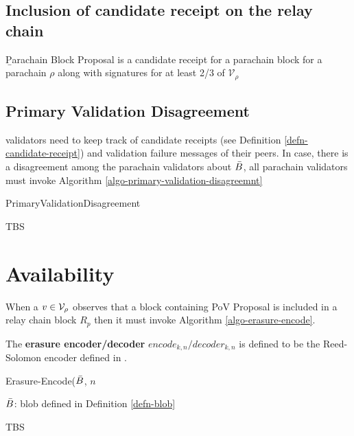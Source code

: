 \subsection{Inclusion of candidate receipt on the relay chain}

\begin{definition}
  \label{defn-para-proposal}
        {\b Parachain Block Proposal} is a candidate receipt for a parachain block for a parachain $\rho$ along with signatures for at least 2/3 of $\mathcal{V}_\rho$ 

\end{definition}

\subsection{Primary Validation Disagreement}
\label{sect-primary-validation-disagreemnt}
 validators need to keep track of candidate receipts (see Definition \ref{defn-candidate-receipt}) and validation failure messages of their peers. In case, there is a disagreement among the parachain validators about $\bar{B}$, all parachain validators must invoke Algorithm \ref{algo-primary-validation-disagreemnt}

\begin{algorithm}
  \caption[]{\sc PrimaryValidationDisagreement}
  \label{algo-primary-validation-disagreemnt}
  \begin{algorithmic}[1]
    \Require{}
    
    \State TBS
  \end{algorithmic}
\end{algorithm}

\section{Availability}

When a $v \in \mathcal{V}_\rho$ observes that a block containing PoV Proposal is included in a relay chain block $R_p$ then it must invoke Algorithm \ref{algo-erasure-encode}.

\begin{definition}
  \label{defn-erasure-encoder-decoder}
  The {\bf erasure encoder/decoder} {\bf $encode_{k,n}/decoder_{k,n}$ } is defined to be the Reed-Solomon encoder defined in \cite{??}. 
\end{definition}

\begin{algorithm}
  \caption[]{\sc Erasure-Encode($\bar{B}$, $n$}
  \label{algo-erasure-encode}
  \begin{algorithmic}[1]
  \Require
    $\bar{B}$: blob defined in Definition \ref{defn-blob}
  
    \State TBS
  \end{algorithmic}
\end{algorithm}


